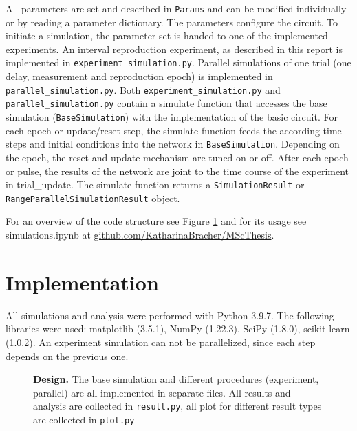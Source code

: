 \documentclass[10pt]{article}
\begin{document}
All parameters are set and described in \texttt{Params} and can be modified individually or by reading a parameter dictionary. The parameters configure the circuit. 
To initiate a simulation, the parameter set is handed to one of the implemented experiments. 
An interval reproduction experiment, as described in this report is implemented in \texttt{experiment\_simulation.py}. 
Parallel simulations of one trial (one delay, measurement and reproduction epoch) is implemented in \texttt{parallel\_simulation.py}.
Both \texttt{experiment\_simulation.py} and \texttt{parallel\_simulation.py} contain a simulate function that accesses the base simulation (\texttt{BaseSimulation}) with the implementation of the basic circuit.
For each epoch or update/reset step, the simulate function feeds the according time steps and initial conditions into the network in \texttt{BaseSimulation}. Depending on the epoch, the reset and update mechanism are tuned on or off. 
After each epoch or pulse, the results of the network are joint to the time course of the experiment in trial\_update. The simulate function returns a \texttt{SimulationResult} or \texttt{RangeParallelSimulationResult} object.

For an overview of the code structure see Figure \ref{fig:code} and for its usage see simulations.ipynb at \href{https://github.com/KatharinaBracher/MScThesis}{github.com/KatharinaBracher/MScThesis}. 

\section{Implementation}
All simulations and analysis were performed with Python 3.9.7. 
The following libraries were used: matplotlib (3.5.1), NumPy (1.22.3), SciPy (1.8.0), scikit-learn (1.0.2). 
An experiment simulation can not be parallelized, since each step depends on the previous one.


\begin{figure}[ht]
	\vspace*{-2cm}
	\caption{\textbf{Design.} The base simulation and different procedures (experiment, parallel) are all implemented in separate files. All results and analysis are collected in \texttt{result.py}, all plot for different result types are collected in \texttt{plot.py}}
\label{fig:code}
\end{figure}


\clearpage
{}
\printbibliography
\end{document}
